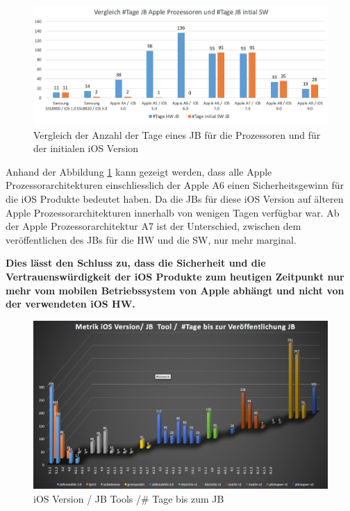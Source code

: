 \begin{figure}[htbp]
        \centering
                \includegraphics[scale=0.55]{Bilder/iDeviceJB-SW-HW.png}
         \caption{Vergleich der Anzahl der Tage eines JB für die Prozessoren und für der initialen iOS Version}
        \label{fig:VergleichJBProzessorSW}      
\end{figure}

Anhand der Abbildung \ref{fig:VergleichJBProzessorSW} kann gezeigt werden, dass alle Apple Prozessorarchitekturen einschliesslich der Apple A6 einen Sicherheitsgewinn für die iOS Produkte bedeutet haben. Da die JBs für diese iOS Version auf älteren Apple Prozessorarchitekturen innerhalb von wenigen Tagen verfügbar war. Ab der Apple Prozessorarchitektur A7 ist der Unterschied, zwischen dem veröffentlichen des JBs für die HW und die SW, nur mehr marginal. \par
\textbf{Dies lässt den Schluss zu, dass die Sicherheit und die Vertrauenswürdigkeit der iOS Produkte zum heutigen Zeitpunkt nur mehr vom mobilen Betriebssystem von Apple abhängt und nicht von der verwendeten iOS HW.}  

\begin{figure}[htbp]
        \centering
                \includegraphics[scale=0.41]{Bilder/Frage1_1.png}
        \caption{iOS Version / JB Tools /\# Tage bis zum JB}
        \label{fig:AnalyseiOSJB1}        
\end{figure}

